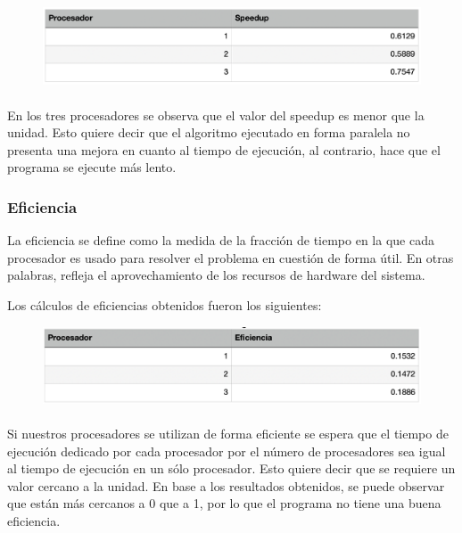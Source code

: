 \documentclass[11pt]{article}
\begin{document}
\begin{figure}[!htbp]
\centering
\includegraphics[width=1\linewidth]{speedup}
\end{figure}

\paragraph{}
En los tres procesadores se observa que el valor del speedup es menor que la unidad. Esto quiere decir que el algoritmo ejecutado en forma paralela no presenta una mejora en cuanto al tiempo de ejecución, al contrario, hace que el programa se ejecute más lento.

\subsubsection{Eficiencia}
La eficiencia se define como la medida de la fracción de tiempo en la que cada procesador es usado para resolver el problema en cuestión de forma útil. En otras palabras, refleja el aprovechamiento de los recursos de hardware del sistema.
\par
Los cálculos de eficiencias obtenidos fueron los siguientes:

\begin{figure}[!htbp]
\centering
\includegraphics[width=1\linewidth]{eficiencia}
\end{figure}

\paragraph{}
Si nuestros procesadores se utilizan de forma eficiente se espera que el tiempo de ejecución dedicado por cada procesador por el número de procesadores sea igual al tiempo de ejecución en un sólo procesador. Esto quiere decir que se requiere un valor cercano a la unidad. En base a los resultados obtenidos, se puede observar que están más cercanos a 0 que a 1, por lo que el programa no tiene una buena eficiencia.
\end{document}
